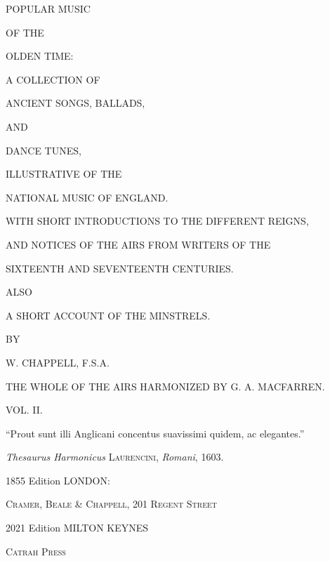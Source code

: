 \frontmatter


\thispagestyle{empty}
\begin{center}


\Huge POPULAR MUSIC
\titlespace

\small OF THE

\titlespace

\Huge OLDEN TIME:

\titlespace

\small A COLLECTION OF

\titlespace

\huge ANCIENT SONGS, BALLADS,

\titlespace

\small AND

\titlespace

\huge DANCE TUNES,

\titlespace

\small ILLUSTRATIVE OF THE

\titlespace

\huge NATIONAL MUSIC OF ENGLAND.

\titlespace

\normalsize WITH SHORT INTRODUCTIONS TO THE DIFFERENT REIGNS,

AND NOTICES OF THE AIRS FROM WRITERS OF THE

SIXTEENTH AND SEVENTEENTH CENTURIES.

\titlespace

\small ALSO

\titlespace

\large A SHORT ACCOUNT OF THE MINSTRELS.

\titlespace

\small BY

\titlespace

\Large W. CHAPPELL, F.S.A.

\titlespace

\normalsize THE WHOLE OF THE AIRS HARMONIZED BY G. A. MACFARREN.

\titlespace

\large VOL. II.

\titlespace

\footnotesize “Prout sunt illi Anglicani concentus suavissimi quidem, ac elegantes.”

\textit{Thesaurus Harmonicus} \textsc{Laurencini}, \textit{Romani}, 1603.

\titlespace

\small 1855 Edition LONDON:

\textsc{Cramer, Beale \& Chappell, 201 Regent Street}

\titlespace

2021 Edition MILTON KEYNES

\textsc{Catrah Press}

\normalsize
\vfill
\end{center}

